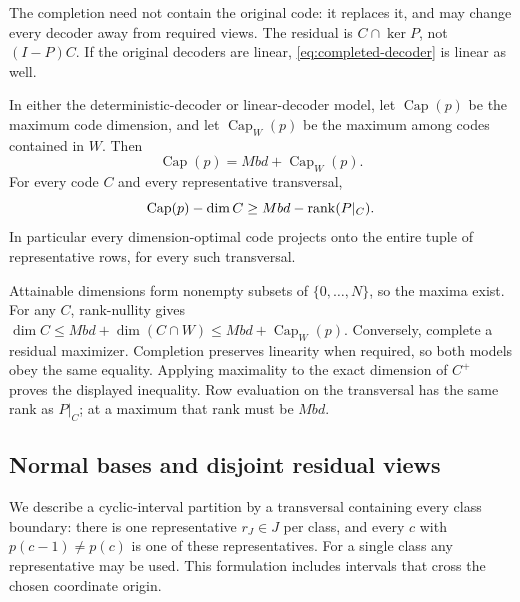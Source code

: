 The completion need not contain the original code: it replaces it, and
may change every decoder away from required views. The residual is
$C\cap\ker P$, not $(I-P)C$. If the original decoders are linear,
\eqref{eq:completed-decoder} is linear as well.

\begin{corollary}\label{cor:residual-capacity}
In either the deterministic-decoder or linear-decoder model, let
$\operatorname{Cap}(p)$ be the maximum code dimension, and let
$\operatorname{Cap}_W(p)$ be the maximum among codes contained in $W$.
Then
\[
 \operatorname{Cap}(p)=Mbd+\operatorname{Cap}_W(p).
\]
For every code $C$ and every representative transversal,
\[
 \operatorname{Cap}(p)-\dim C\ge Mbd-\operatorname{rank}(P|_C).
\]
In particular every dimension-optimal code projects onto the entire tuple
of representative rows, for every such transversal.
\end{corollary}
\begin{outline}
Attainable dimensions form nonempty subsets of $\{0,\ldots,N\}$, so
the maxima exist. For any $C$, rank-nullity gives
$\dim C\le Mbd+\dim(C\cap W)\le Mbd+\operatorname{Cap}_W(p)$.
Conversely, complete a residual maximizer. Completion preserves linearity
when required, so both models obey the same equality. Applying maximality
to the exact dimension of $C^+$ proves the displayed inequality. Row
evaluation on the transversal has the same rank as $P|_C$; at a maximum
that rank must be $Mbd$.
\end{outline}

\subsection{Normal bases and disjoint residual views}

We describe a cyclic-interval partition by a transversal containing every
class boundary: there is one representative $r_J\in J$ per class, and
every $c$ with $p(c-1)\ne p(c)$ is one of these representatives.
For a single class any representative may be used. This formulation
includes intervals that cross the chosen coordinate origin.

